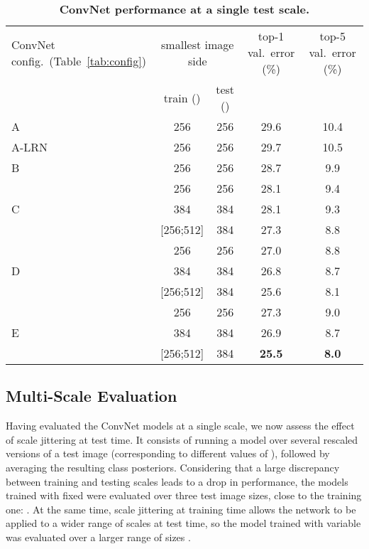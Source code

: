 \documentclass{article} \usepackage{iclr2015,times}
\newcommand{\tblref}[1]{Table~\ref{#1}}
\begin{document}
\vspace{-2em}

\begin{table}[htb]
\small
\centering
\caption{\textbf{ConvNet performance at a single test scale.}
}
\begin{tabular}{|l|c|c|c|c|} \hline
ConvNet config.\ (\tblref{tab:config}) & \multicolumn{2}{c|}{smallest image side} & top-1 val.\ error (\%) & top-5 val.\ error (\%) \\ \cline{2-3}
& train () & test () & & \\ \hline
A & 256 & 256 & 29.6 & 10.4  \\ \hline
A-LRN & 256 & 256 & 29.7 & 10.5  \\ \hline
B & 256 & 256 & 28.7 & 9.9  \\ \hline
\multirow{3}{*}{C} & 256 & 256 & 28.1 & 9.4  \\ \cline{2-5}
 & 384 & 384 & 28.1 & 9.3  \\ \cline{2-5}
 & [256;512] & 384 & 27.3  & 8.8  \\ \hline
 \multirow{3}{*}{D} & 256 & 256 & 27.0  & 8.8  \\ \cline{2-5}
 & 384 & 384 & 26.8  & 8.7  \\ \cline{2-5}
 & [256;512] & 384 & 25.6  & 8.1  \\ \hline
 \multirow{3}{*}{E} & 256 & 256 & 27.3  & 9.0  \\ \cline{2-5}
 & 384 & 384 & 26.9  & 8.7  \\ \cline{2-5}
 & [256;512] & 384 & \textbf{25.5}  & \textbf{8.0}  \\ \hline
\end{tabular}
\label{tab:results_single_scale}
\end{table}


\subsection{Multi-Scale Evaluation}
\label{sec:multi-scale}

Having evaluated the ConvNet models at a single scale, we now assess the effect of scale jittering at test time.
It consists of running a model over several rescaled versions of a test image (corresponding to different values of ), followed by averaging the resulting class posteriors.
Considering that a large discrepancy between training and testing scales leads to a drop in performance, the models trained with fixed  were evaluated over 
three test image sizes, close to the training one: . 
At the same time, scale jittering at training time allows the network to be applied to a wider range of scales at test time, so the model trained
with variable  was evaluated over a larger range of sizes . 
\end{document}
